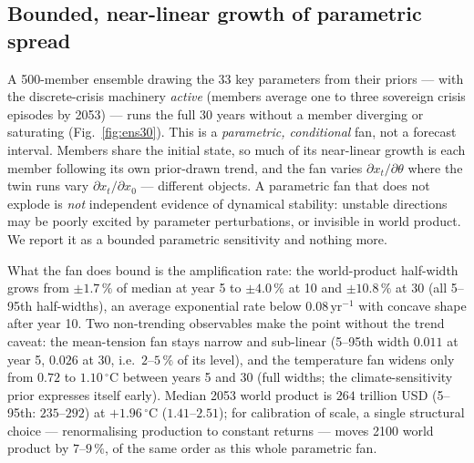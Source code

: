 \documentclass[12pt,a4paper]{article}
\newcommand{\degC}{$^{\circ}$C}
\newcommand{\gdpMed}{264}  \newcommand{\gdpLo}{235}  \newcommand{\gdpHi}{292}
\newcommand{\tempMed}{1.96} \newcommand{\tempLo}{1.41} \newcommand{\tempHi}{2.51}
\newcommand{\fanThirty}{10.8}
\begin{document}
\subsection{Bounded, near-linear growth of parametric spread}

A 500-member ensemble drawing the 33 key parameters from their priors --- with the
discrete-crisis machinery \emph{active} (members average one to three sovereign crisis
episodes by 2053) --- runs the full 30 years without a member diverging or saturating
(Fig.~\ref{fig:ens30}). This is a \emph{parametric, conditional} fan, not a forecast interval. Members share the
initial state, so much of its near-linear growth is each member following its own prior-drawn
trend, and the fan varies $\partial x_t/\partial\theta$ where the twin runs vary $\partial
x_t/\partial x_0$ --- different objects. A parametric fan that does not explode is \emph{not}
independent evidence of dynamical stability: unstable directions may be poorly excited by
parameter perturbations, or invisible in world product. We report it as a bounded parametric
sensitivity and nothing more.

What the fan does bound is the amplification rate: the world-product half-width grows from
$\pm1.7\,\%$ of median at year 5 to $\pm4.0\,\%$ at 10 and $\pm\fanThirty\,\%$ at 30 (all
5--95th half-widths), an average exponential rate below $0.08$\,yr$^{-1}$ with concave shape
after year 10. Two non-trending observables make the point without the trend caveat: the
mean-tension fan stays narrow and sub-linear (5--95th width $0.011$ at year 5, $0.026$ at 30,
i.e.\ $2$--$5\,\%$ of its level), and the temperature fan widens only from $0.72$ to
$1.10$\,\degC{} between years 5 and 30 (full widths; the climate-sensitivity prior expresses
itself early). Median 2053 world product is $\gdpMed$ trillion USD (5--95th:
$\gdpLo$--$\gdpHi$) at $+\tempMed$\,\degC{} ($\tempLo$--$\tempHi$); for calibration of scale, a
single structural choice --- renormalising production to constant returns --- moves 2100 world
product by $7$--$9\,\%$, of the same order as this whole parametric fan.
\end{document}

